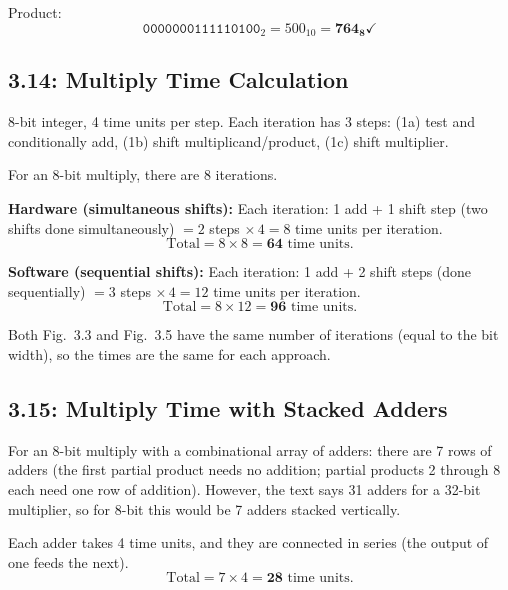 Product:
\[
  \texttt{0000000111110100}_2 = 500_{10} = \mathbf{764_8} \checkmark
\]

\subsection*{3.14: Multiply Time Calculation}
\hypertarget{sol-3.14}{}

8-bit integer, 4 time units per step. Each iteration has 3 steps: (1a) test and
conditionally add, (1b) shift multiplicand/product, (1c) shift multiplier.

For an 8-bit multiply, there are 8 iterations.

\medskip\noindent\textbf{Hardware (simultaneous shifts):}
Each iteration: 1 add + 1 shift step (two shifts done simultaneously) $= 2$ steps
$\times\, 4 = 8$ time units per iteration.
\[
  \text{Total} = 8 \times 8 = \mathbf{64} \text{ time units.}
\]

\medskip\noindent\textbf{Software (sequential shifts):}
Each iteration: 1 add + 2 shift steps (done sequentially) $= 3$ steps
$\times\, 4 = 12$ time units per iteration.
\[
  \text{Total} = 8 \times 12 = \mathbf{96} \text{ time units.}
\]

\medskip\noindent Both Fig.~3.3 and Fig.~3.5 have the same number of iterations
(equal to the bit width), so the times are the same for each approach.

\subsection*{3.15: Multiply Time with Stacked Adders}
\hypertarget{sol-3.15}{}

For an 8-bit multiply with a combinational array of adders: there are 7 rows of
adders (the first partial product needs no addition; partial products 2 through 8
each need one row of addition). However, the text says 31 adders for a 32-bit
multiplier, so for 8-bit this would be 7 adders stacked vertically.

Each adder takes 4 time units, and they are connected in series (the output of
one feeds the next).
\[
  \text{Total} = 7 \times 4 = \mathbf{28} \text{ time units.}
\]

